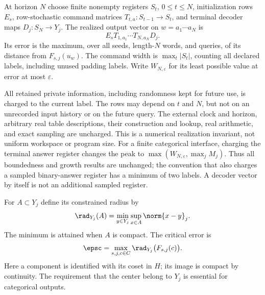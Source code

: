 \begin{definition}\label{def:machine54}
At horizon $N$ choose finite nonempty registers $S_t$, $0\le t\le N$, initialization rows $E_s$, row-stochastic command matrices $T_{t,a}:S_{t-1}\to S_t$, and terminal decoder maps $D_j:S_N\to Y_j$. The realized output vector on $w=a_1\cdots a_N$ is
\[
 E_sT_{1,a_1}\cdots T_{N,a_N}D_j.
\]
Its error is the maximum, over all seeds, length-$N$ words, and queries, of its distance from $F_{s,j}(u_w)$. The command width is $\max_t|S_t|$, counting all declared labels, including unused padding labels. Write $W_{N,\varepsilon}$ for its least possible value at error at most $\varepsilon$.
\end{definition}
All retained private information, including randomness kept for future use, is charged to the current label. The rows may depend on $t$ and $N$, but not on an unrecorded input history or on the future query. The external clock and horizon, arbitrary real table descriptions, their construction and lookup, real arithmetic, and exact sampling are uncharged. This is a numerical realization invariant, not uniform workspace or program size. For a finite categorical interface, charging the terminal answer register changes the peak to $\max(W_{N,\varepsilon},\max_j M_j)$. Thus all boundedness and growth results are unchanged; the convention that also charges a sampled binary-answer register has a minimum of two labels. A decoder vector by itself is not an additional sampled register.

For $A\subset Y_j$ define its constrained radius by
\[
 \rad_{Y_j}(A)=\min_{y\in Y_j}\sup_{x\in A}\norm{x-y}_j.
\]
The minimum is attained when $A$ is compact. The critical error is
\begin{equation}\label{eq:radius54}
 \epsc=\max_{s,j,c\in C}\rad_{Y_j}\bigl(F_{s,j}(c)\bigr).
\end{equation}
Here a component is identified with its coset in $H$; its image is compact by continuity. The requirement that the center belong to $Y_j$ is essential for categorical outputs.

